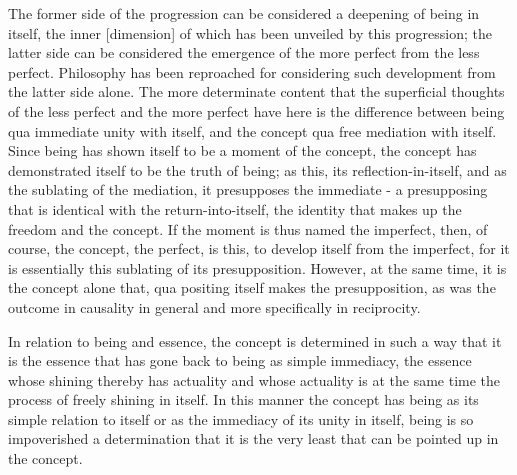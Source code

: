     The former side of the progression can be considered
    a deepening of being in itself,
    the inner [dimension] of which has been unveiled by this progression;
    the latter side can be considered the emergence of the more perfect
    from the less perfect.
    Philosophy has been reproached for considering
    such development from the latter side alone.
    The more determinate
    content that the superficial thoughts of the less perfect and the more
    perfect have here is the difference between being qua immediate
    unity with itself, and the concept qua free mediation with itself.
    Since being has shown itself to be a moment of the concept,
    the concept has demonstrated itself to be the truth of being;
    as this, its reflection-in-itself, and as the sublating of the mediation,
    it presupposes the immediate - a presupposing that is identical with
    the return-into-itself, the identity that makes up the freedom and
    the concept.
    If the moment is thus named the imperfect, then,
    of course, the concept, the perfect, is this, to develop itself from
    the imperfect, for it is essentially this sublating of its presupposition.
    However, at the same time, it is the concept alone that,
    qua positing itself makes the presupposition,
    as was the outcome in causality in general and
    more specifically in reciprocity.

    In relation to being and essence, the concept is determined
    in such a way that it is the essence that has gone back to being
    as simple immediacy, the essence whose shining thereby has actuality and
    whose actuality is at the same time the process of freely shining in itself.
    In this manner the concept has being as its simple relation
    to itself or as the immediacy of its unity in itself,
    being is so impoverished a determination that it is
    the very least that can be pointed up in the concept.

